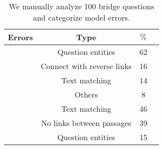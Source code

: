 
\begin{table}[!tb]
    \centering
    \small
      \begin{tabular}{lccc}
        \toprule
       \textbf{Errors} & \textbf{Type}  & \textbf{$\%$}\\
       \midrule
       & Question entities& 62  &\\
       \grr{} & Connect with reverse links& 16  &\\
       & Text matching& 14  &\\
       &Others& 8  &\\
       \midrule
       &Text matching& 46  &\\
       \name{} &No links between passages& 39  &\\
       & Question entities& 15  &\\
        
      \bottomrule
      \end{tabular}
      \caption{We manually analyze 100 bridge questions and categorize model errors. 
      }
    \label{tb:human-eval}

  \end{table}
